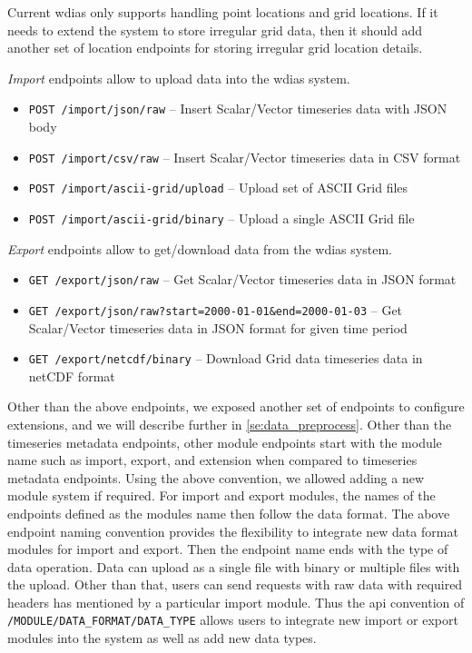 Current \acrshort{wdias} only supports handling point locations and grid locations. If it needs to extend the system to store irregular grid data, then it should add another set of location endpoints for storing irregular grid location details.

\emph{Import} endpoints allow to upload data into the \acrshort{wdias} system.
\begin{itemize}
    \item \texttt{POST /import/json/raw} -- Insert Scalar/Vector timeseries data with JSON body
    \item \texttt{POST /import/csv/raw} -- Insert Scalar/Vector timeseries data in CSV format
    \item \texttt{POST /import/ascii-grid/upload} -- Upload set of ASCII Grid files
    \item \texttt{POST /import/ascii-grid/binary} -- Upload a single ASCII Grid file
\end{itemize}

\emph{Export} endpoints allow to get/download data from the \acrshort{wdias} system.
\begin{itemize}
    \item \texttt{GET /export/json/raw} -- Get Scalar/Vector timeseries data in JSON format
    \item \texttt{GET /export/json/raw?start=2000-01-01\&end=2000-01-03} -- Get Scalar/Vector timeseries data in JSON format for given time period
    \item \texttt{GET /export/netcdf/binary} -- Download Grid data timeseries data in \acrshort{netCDF} format
\end{itemize}

Other than the above endpoints, we exposed another set of endpoints to configure extensions, and we will describe further in \cref{se:data_preprocess}.
Other than the timeseries metadata endpoints, other module endpoints start with the module name such as import, export, and extension when compared to timeseries metadata endpoints. Using the above convention, we allowed adding a new module system if required.
For import and export modules, the names of the endpoints defined as the modules name then follow the data format. The above endpoint naming convention provides the flexibility to integrate new data format modules for import and export. Then the endpoint name ends with the type of data operation. Data can upload as a single file with binary or multiple files with the upload. Other than that, users can send requests with raw data with required headers has mentioned by a particular import module.
Thus the \acrshort{api} convention of \texttt{/MODULE/DATA\_FORMAT/DATA\_TYPE} allows users to integrate new import or export modules into the system as well as add new data types.
